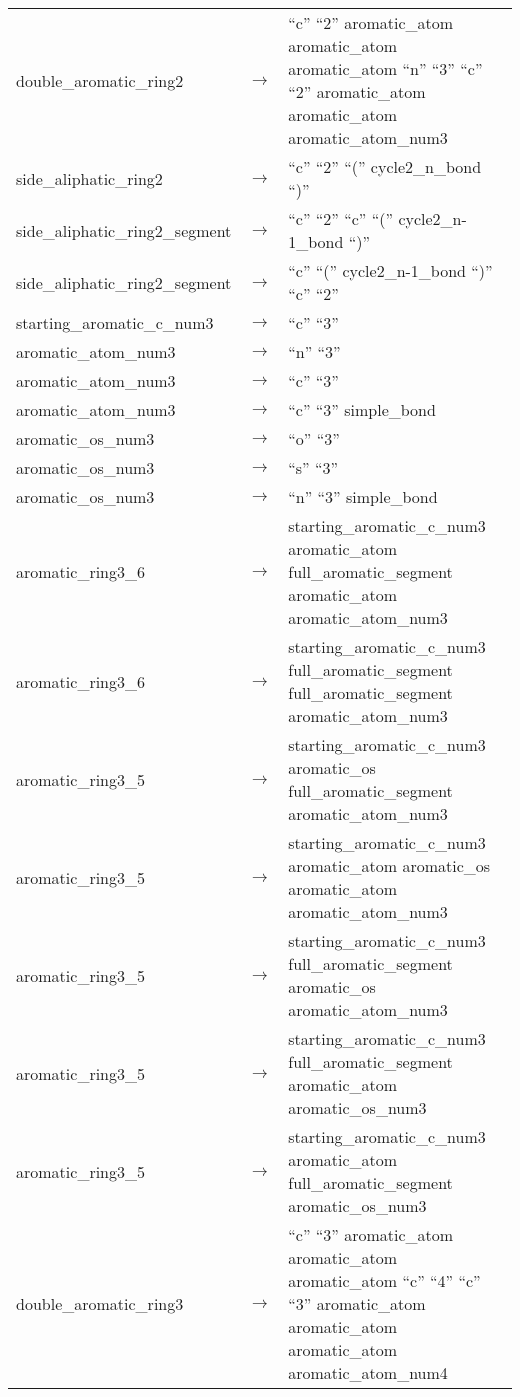\begin{longtable}{m{} p{} p{}}
    double\_aromatic\_ring2 & $\rightarrow$ & ``c'' ``2'' aromatic\_atom aromatic\_atom aromatic\_atom ``n'' ``3'' ``c'' ``2'' aromatic\_atom aromatic\_atom aromatic\_atom\_num3 \\
    side\_aliphatic\_ring2 & $\rightarrow$ & ``c'' ``2'' ``('' cycle2\_n\_bond ``)'' \\
    side\_aliphatic\_ring2\_segment & $\rightarrow$ & ``c'' ``2'' ``c'' ``('' cycle2\_n-1\_bond ``)'' \\
    side\_aliphatic\_ring2\_segment & $\rightarrow$ & ``c'' ``('' cycle2\_n-1\_bond ``)'' ``c'' ``2'' \\
    starting\_aromatic\_c\_num3 & $\rightarrow$ & ``c'' ``3'' \\
    aromatic\_atom\_num3 & $\rightarrow$ & ``n'' ``3'' \\
    aromatic\_atom\_num3 & $\rightarrow$ & ``c'' ``3'' \\
    aromatic\_atom\_num3 & $\rightarrow$ & ``c'' ``3'' simple\_bond \\
    aromatic\_os\_num3 & $\rightarrow$ & ``o'' ``3'' \\
    aromatic\_os\_num3 & $\rightarrow$ & ``s'' ``3'' \\
    aromatic\_os\_num3 & $\rightarrow$ & ``n'' ``3'' simple\_bond \\
    aromatic\_ring3\_6 & $\rightarrow$ & starting\_aromatic\_c\_num3 aromatic\_atom full\_aromatic\_segment aromatic\_atom aromatic\_atom\_num3 \\
    aromatic\_ring3\_6 & $\rightarrow$ & starting\_aromatic\_c\_num3 full\_aromatic\_segment full\_aromatic\_segment aromatic\_atom\_num3 \\
    aromatic\_ring3\_5 & $\rightarrow$ & starting\_aromatic\_c\_num3 aromatic\_os full\_aromatic\_segment aromatic\_atom\_num3 \\
    aromatic\_ring3\_5 & $\rightarrow$ & starting\_aromatic\_c\_num3 aromatic\_atom aromatic\_os aromatic\_atom aromatic\_atom\_num3 \\
    aromatic\_ring3\_5 & $\rightarrow$ & starting\_aromatic\_c\_num3 full\_aromatic\_segment aromatic\_os aromatic\_atom\_num3 \\
    aromatic\_ring3\_5 & $\rightarrow$ & starting\_aromatic\_c\_num3 full\_aromatic\_segment aromatic\_atom aromatic\_os\_num3 \\
    aromatic\_ring3\_5 & $\rightarrow$ & starting\_aromatic\_c\_num3 aromatic\_atom full\_aromatic\_segment aromatic\_os\_num3 \\
    double\_aromatic\_ring3 & $\rightarrow$ & ``c'' ``3'' aromatic\_atom aromatic\_atom aromatic\_atom ``c'' ``4'' ``c'' ``3'' aromatic\_atom aromatic\_atom aromatic\_atom aromatic\_atom\_num4 \\

\end{longtable}
